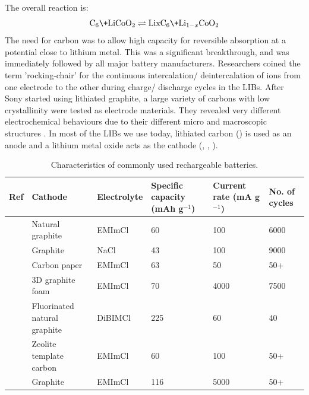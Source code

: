 The overall reaction is:
\begin{equation}
\ce{C6} \+ \ce{LiCoO2} \rightleftharpoons \ce{LixC6} \+ \ce{Li_{1-x}CoO2}
\end{equation}
The need for carbon was to allow high capacity for reversible  absorption at a potential close to lithium metal. This was a significant breakthrough, and was immediately followed by all major battery manufacturers. Researchers coined the term 'rocking-chair' for the  continuous intercalation/ deintercalation of ions from one electrode to the other during charge/ discharge cycles in the LIBs. After Sony started using lithiated graphite, a large variety of carbons with low crystallinity were tested as electrode materials. They revealed very different electrochemical behaviours due to their different micro and macroscopic structures \cite{yoo_large_2008}. In most of the LIBs we use today, lithiated carbon () is used as an anode and a lithium metal oxide acts as the cathode (, , ).  

\begin{table}
\caption{Characteristics of commonly used rechargeable batteries.} \label{tabCref}
\begin{center}
\begin{tabular}{ |p{0.5cm}|p{2.5cm}|p{2cm}|p{2.5cm}|p{2.5cm}|p{1.5cm}|}
\hline
\textbf{Ref} & \textbf{Cathode} & \textbf{Electrolyte} & \textbf{Specific capacity (mAh g$^{-1}$)} & \textbf{Current rate (mA g$^{-1}$)} & \textbf{No. of cycles} \\
\hline
\cite{wang_advanced_2017} & Natural graphite & EMImCl & 60 & 100 & 6000 \\
\cite{song_long-life_2017} & Graphite & NaCl & 43 & 100 & 9000 \\
\cite{sun_new_2015} & Carbon paper & EMImCl & 63 & 50 & 50+ \\
\cite{lin_ultrafast_2015-3} & 3D graphite foam & EMImCl & 70 & 4000 & 7500 \\
\cite{rani_fluorinated_2013} & Fluorinated natural graphite & DiBIMCl & 225 & 60 & 40 \\
\cite{stadie_zeolite-templated_2017} & Zeolite template carbon & EMImCl & 60 & 100 & 50+ \\
& Graphite & EMImCl & 116 & 5000 & 50+ \\*

\hline
\end{tabular}
\end{center}
\end{table}

